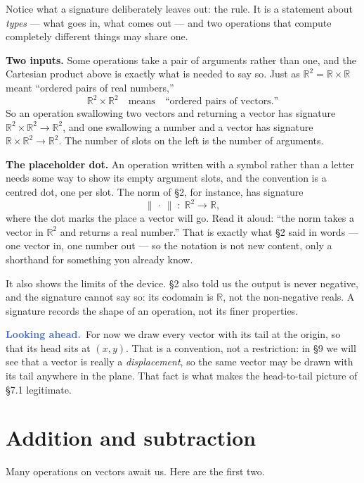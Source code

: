 \documentclass[11pt]{article}
\theoremstyle{definition}
\theoremstyle{remark}
\newcommand{\lookahead}{\par\smallskip\noindent
  \textbf{\sffamily\textcolor{RoyalBlue}{Looking ahead.}}\ \ignorespaces}
\newcommand{\R}{\mathbb{R}}
\newcommand{\norm}[1]{\lVert #1\rVert}
\begin{document}
Notice what a signature deliberately leaves out: the rule. It is a statement
about \emph{types} --- what goes in, what comes out --- and two operations that
compute completely different things may share one.

\smallskip
\noindent\textbf{Two inputs.} Some operations take a pair of arguments rather
than one, and the Cartesian product above is exactly what is needed to say so.
Just as $\R^{2}=\R\times\R$ meant ``ordered pairs of real numbers,''
\[
  \R^{2}\times\R^{2}
  \quad\text{means}\quad
  \text{``ordered pairs of vectors.''}
\]
So an operation swallowing two vectors and returning a vector has signature
$\R^{2}\times\R^{2}\to\R^{2}$, and one swallowing a number and a vector has
signature $\R\times\R^{2}\to\R^{2}$. The number of slots on the left is the
number of arguments.

\smallskip
\noindent\textbf{The placeholder dot.} An operation written with a symbol rather
than a letter needs some way to show its empty argument slots, and the
convention is a centred dot, one per slot. The norm of \S2, for instance, has
signature
\[
  \norm{\,\cdot\,} \;:\; \R^{2}\to\R ,
\]
where the dot marks the place a vector will go. Read it aloud: ``the norm takes
a vector in $\R^{2}$ and returns a real number.'' That is exactly what \S2 said
in words --- one vector in, one number out --- so the notation is not new
content, only a shorthand for something you already know.

It also shows the limits of the device. \S2 also told us the output is never
negative, and the signature cannot say so: its codomain is $\R$, not the
non-negative reals. A signature records the shape of an operation, not its
finer properties.

\lookahead For now we draw every vector with its tail at the origin, so that its
head sits at $(x,y)$. That is a convention, not a restriction: in \S9 we will
see that a vector is really a \emph{displacement}, so the same vector may be
drawn with its tail anywhere in the plane. That fact is what makes the
head-to-tail picture of \S7.1 legitimate.

\section{Addition and subtraction}
Many operations on vectors await us. Here are the first two.
\end{document}
